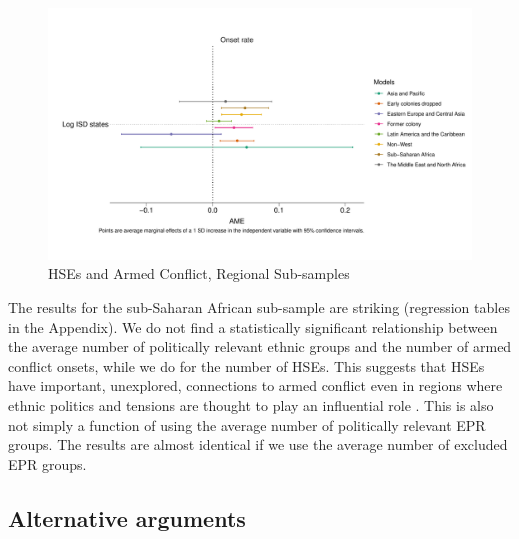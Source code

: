 \begin{figure}[!htb]
\includegraphics[width=\textwidth,keepaspectratio]{img/main_regional.pdf}
\caption{HSEs and Armed Conflict, Regional Sub-samples} \label{Fig: Reg_Margins}
\end{figure}

The results for the sub-Saharan African sub-sample are striking (regression
tables in the Appendix). We do not find a statistically significant relationship
between the average number of politically relevant ethnic groups and the number
of armed conflict onsets, while we do for the number of HSEs. This suggests that
HSEs have important, unexplored, connections to armed conflict even in regions
where ethnic politics and tensions are thought to play an influential role
\citep{Cederman2010}. This is also not simply a function of using the average
number of politically relevant EPR groups. The results are almost identical if
we use the average number of excluded EPR groups. 


\subsection{Alternative arguments}

